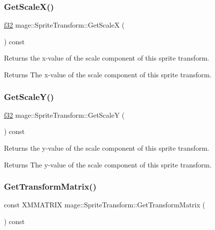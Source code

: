 \subsubsection{\texorpdfstring{Get\+Scale\+X()}{GetScaleX()}}
{\footnotesize\ttfamily \hyperlink{namespacemage_a6a44ad388483959dc4dff9f2aef91431}{f32} mage\+::\+Sprite\+Transform\+::\+Get\+ScaleX (\begin{DoxyParamCaption}{ }\end{DoxyParamCaption}) const\hspace{0.3cm}{\ttfamily [noexcept]}}

Returns the x-\/value of the scale component of this sprite transform.

\begin{DoxyReturn}{Returns}
The x-\/value of the scale component of this sprite transform. 
\end{DoxyReturn}
\hypertarget{structmage_1_1_sprite_transform_a87e7cede1b94eafcbab1e616cf072cef}{}\label{structmage_1_1_sprite_transform_a87e7cede1b94eafcbab1e616cf072cef} 
\subsubsection{\texorpdfstring{Get\+Scale\+Y()}{GetScaleY()}}
{\footnotesize\ttfamily \hyperlink{namespacemage_a6a44ad388483959dc4dff9f2aef91431}{f32} mage\+::\+Sprite\+Transform\+::\+Get\+ScaleY (\begin{DoxyParamCaption}{ }\end{DoxyParamCaption}) const\hspace{0.3cm}{\ttfamily [noexcept]}}

Returns the y-\/value of the scale component of this sprite transform.

\begin{DoxyReturn}{Returns}
The y-\/value of the scale component of this sprite transform. 
\end{DoxyReturn}
\hypertarget{structmage_1_1_sprite_transform_a4e5d58a02d951c021e3e41e4ac183d0d}{}\label{structmage_1_1_sprite_transform_a4e5d58a02d951c021e3e41e4ac183d0d} 
\subsubsection{\texorpdfstring{Get\+Transform\+Matrix()}{GetTransformMatrix()}}
{\footnotesize\ttfamily const X\+M\+M\+A\+T\+R\+IX mage\+::\+Sprite\+Transform\+::\+Get\+Transform\+Matrix (\begin{DoxyParamCaption}{ }\end{DoxyParamCaption}) const\hspace{0.3cm}{\ttfamily [noexcept]}}

